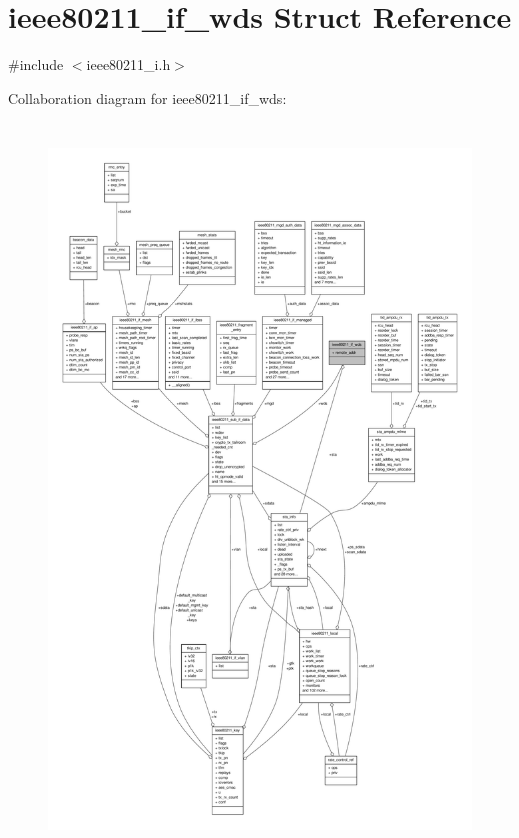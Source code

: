 \hypertarget{structieee80211__if__wds}{\section{ieee80211\-\_\-if\-\_\-wds Struct Reference}
\label{structieee80211__if__wds}
}


{\ttfamily \#include $<$ieee80211\-\_\-i.\-h$>$}



Collaboration diagram for ieee80211\-\_\-if\-\_\-wds\-:
\nopagebreak
\begin{figure}[H]
\begin{center}
\leavevmode
\includegraphics[height=550pt]{structieee80211__if__wds__coll__graph}
\end{center}
\end{figure}
